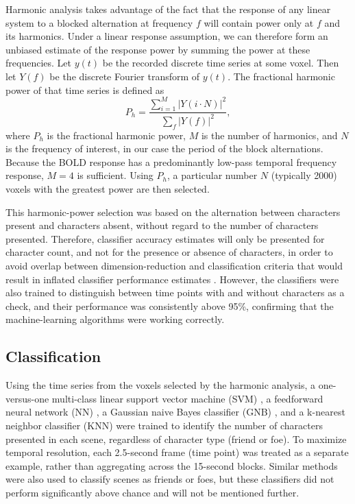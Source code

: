 \documentclass[5p,authoryear]{elsarticle}
\begin{document}
Harmonic analysis takes advantage of the fact that the response of any linear system to a blocked alternation at frequency $f$ will contain power only at $f$ and its harmonics. 
Under a linear response assumption, we can therefore form an unbiased estimate of the response power by summing the power at these frequencies. 
Let $y(t)$ be the recorded discrete time series at some voxel.
Then let $Y(f)$ be the discrete Fourier transform of $y(t)$.
The fractional harmonic power of that time series is defined as
\begin{equation}
P_h = \frac{\sum_{i = 1}^{M}{\left|Y(i \cdot N)\right|^{2}}}{\sum_{f}{\left|Y(f)\right|^{2}}},
\end{equation}
where $P_h$ is the fractional harmonic power, $M$ is the number of harmonics, and $N$ is the frequency of interest, in our case the period of the block alternations. 
Because the BOLD response has a predominantly low-pass temporal frequency response, $M = 4$ is sufficient. 
Using $P_h$, a particular number $N$ (typically 2000) voxels with the greatest power are then selected. 

This harmonic-power selection was based on the alternation between characters present and characters absent, without regard to the number of characters presented. 
Therefore, classifier accuracy estimates will only be presented for character count, and not for the presence or absence of characters, in order to avoid overlap between dimension-reduction and  classification criteria that would result in inflated classifier performance estimates \citep{Pereira2009}.
However, the classifiers were also trained to distinguish between time points with and without characters as a check, and their performance was consistently above 95\%, confirming that the machine-learning algorithms were working correctly.

\subsection{Classification}
Using the time series from the voxels selected by the harmonic analysis, a one-versus-one multi-class linear support vector machine (SVM) \citep{Cortes1995,Weston1999}, a feedforward neural network (NN) \citep{Hornik1989,Hagan1994}, a Gaussian naive Bayes classifier (GNB) \citep{Duda1973}, and a k-nearest neighbor classifier (KNN) \citep{Cover1967} were trained to identify the number of characters presented in each scene, regardless of character type (friend or foe).
To maximize temporal resolution, each 2.5-second frame (time point) was treated as a separate example, rather than aggregating across the 15-second blocks.
Similar methods were also used to classify scenes as friends or foes, but these classifiers did not perform significantly above chance and will not be mentioned further.
\end{document}
